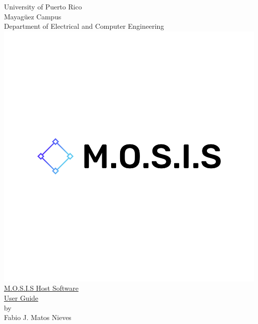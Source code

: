 \begin{titlepage}
  \begin{center}
    \large{University of Puerto Rico\\
    Mayagüez Campus\\
    \vspace{\baselineskip}
    Department of Electrical and Computer Engineering}
  \includegraphics[scale=0.2]{../Title_Page/default.png}\\
    \Huge{\underline{M.O.S.I.S Host Software}\\}
    \Huge{\underline{User Guide}\\}
    \vspace{5cm}
    \large by\\
    Fabio J. Matos Nieves\\
    \normalsize
  \end{center}
\end{titlepage}
